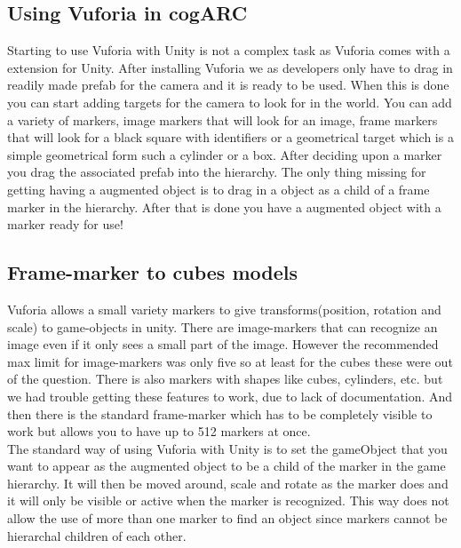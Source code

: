 \subsection{Using Vuforia in cogARC}
\label{subsec:usingVuforiaincogARC}
Starting to use Vuforia with Unity is not a complex task as Vuforia comes with a extension for Unity.
After installing Vuforia we as developers only have to drag in readily made \gls{prefab} for the camera and it is ready to be used.
When this is done you can start adding targets for the camera to look for in the world.
You can add a variety of markers, image markers that will look for an image, frame markers that will look for a black square with identifiers or a geometrical target which is a simple geometrical form such a cylinder or a box.
After deciding upon a marker you drag the associated prefab into the hierarchy.
The only thing missing for getting having a augmented object is to drag in a object as a child of a frame marker in the hierarchy.
After that is done you have a augmented object with a marker ready for use!

\subsection{Frame-marker to cubes models}
\label{subsec:framemarker_model} 
Vuforia allows a small variety markers to give transforms(position, rotation and scale) to game-objects in unity. 
There are image-markers that can recognize an image even if it only sees a small part of the image. 
However the recommended max limit for image-markers was only five so at least for the cubes these were out of the question. 
There is also markers with shapes like cubes, cylinders, etc. but we had trouble getting these features to work, due to lack of documentation. 
And then there is the standard frame-marker which has to be completely visible to work but allows you to have up to 512 markers at once.\\
The standard way of using Vuforia with Unity is to set the gameObject that you want to appear as the augmented object to be a child of the marker in the game hierarchy. 
It will then be moved around, scale and rotate as the marker does and it will only be visible or active when the marker is recognized. 
This way does not allow the use of more than one marker to find an object since markers cannot be hierarchal children of each other. 

